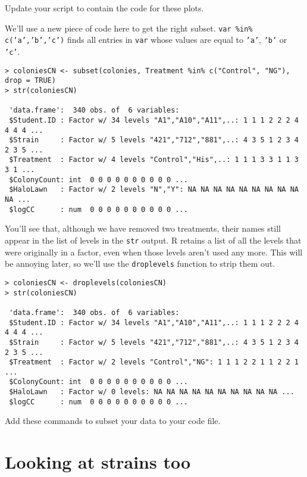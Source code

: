 \begin{compactitem}[$\quad\star$]
	\item Update your script to contain the code for these plots.
\end{compactitem}

We'll use a new piece of code here to get the right subset. {\tt var 
\%in\% c('a','b','c')} finds all entries in {\tt var} whose values are 
equal to {\tt 'a'},  {\tt 'b'} or  {\tt 'c'}.

\begin{lstlisting}
> coloniesCN <- subset(colonies, Treatment %in% c("Control", "NG"), 
drop = TRUE) 
> str(coloniesCN)

 'data.frame':	340 obs. of  6 variables:
 $Student.ID : Factor w/ 34 levels "A1","A10","A11",..: 1 1 1 2 2 2 4 4 4 4 ...
 $Strain     : Factor w/ 5 levels "421","712","881",..: 4 3 5 1 2 3 4 2 3 5 ...
 $Treatment  : Factor w/ 4 levels "Control","His",..: 1 1 1 3 3 1 1 3 3 1 ...
 $ColonyCount: int  0 0 0 0 0 0 0 0 0 0 ...
 $HaloLawn   : Factor w/ 2 levels "N","Y": NA NA NA NA NA NA NA NA NA NA ...
 $logCC      : num  0 0 0 0 0 0 0 0 0 0 ...
\end{lstlisting}

You'll see that, although we have removed two treatments, their names 
still appear in the list of levels in the {\tt str} output. R retains a 
list of all the levels that were originally in a factor, even when 
those levels aren't used any more. This will be annoying later, so 
we'll use the {\tt droplevels} function to strip them out.

\begin{lstlisting}
> coloniesCN <- droplevels(coloniesCN)
> str(coloniesCN)

 'data.frame':	340 obs. of  6 variables:
 $Student.ID : Factor w/ 34 levels "A1","A10","A11",..: 1 1 1 2 2 2 4 4 4 4 ...
 $Strain     : Factor w/ 5 levels "421","712","881",..: 4 3 5 1 2 3 4 2 3 5 ...
 $Treatment  : Factor w/ 2 levels "Control","NG": 1 1 1 2 2 1 1 2 2 1 ...
 $ColonyCount: int  0 0 0 0 0 0 0 0 0 0 ...
 $HaloLawn   : Factor w/ 0 levels: NA NA NA NA NA NA NA NA NA NA ...
 $logCC      : num  0 0 0 0 0 0 0 0 0 0 ...
\end{lstlisting}

\begin{compactitem}[$\quad\star$]
	\item Add these commands to subset your data to your code file.
\end{compactitem}

\section{Looking at strains too}

